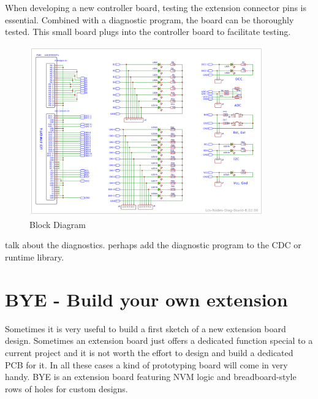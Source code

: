 When developing a new controller board, testing the extension connector pins is essential. Combined with a diagnostic program, the board can be thoroughly tested. This small board plugs into the controller board to facilitate testing.

\begin{figure}[htbp]
    \centering
    \includegraphics[page=1, width=0.9\textwidth]{./Schematics/Schematic_LcsNodes-Diagnostic-Board.pdf}
    \caption{Block Diagram}
\end{figure}
\FloatBarrier

talk about the diagnostics. perhaps add the diagnostic program to the CDC or runtime library.

\section{BYE - Build your own extension}

Sometimes it is very useful to build a first sketch of a new extension board design. Sometimes an extension board just offers a dedicated function special to a current project and it is not worth the effort to design and build a dedicated PCB for it. In all these cases a kind of prototyping board will come in very handy. BYE is an extension board featuring NVM logic and breadboard-style rows of holes for custom designs. 


